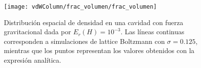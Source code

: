 \begin{figure}[ht]
	\centering
	\texttt{[image: vdWColumn/frac\_volumen/frac\_volumen]}
	\caption{Distribuci\'on espacial de densidad en una cavidad con fuerza gravitacional dada por $E_r(H)=10^{-3}$. Las l\'ineas continuas corresponden a simulaciones de lattice Boltzmann con $\sigma=0.125$, mientras que los puntos representan los valores obtenidos con la expresi\'on anal\'itica.}
	\label{fig:vdWColumn_frac_volumen}
\end{figure}